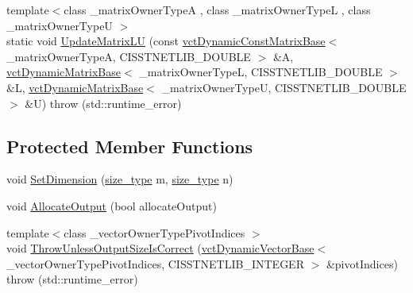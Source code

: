 \begin{DoxyCompactItemize}
\item 
{\footnotesize template$<$class \-\_\-matrix\-Owner\-Type\-A , class \-\_\-matrix\-Owner\-Type\-L , class \-\_\-matrix\-Owner\-Type\-U $>$ }\\static void \hyperlink{classnmr_l_u_dynamic_data_aa443b07fe53b5008e217350c86f4dd35}{Update\-Matrix\-L\-U} (const \hyperlink{classvct_dynamic_const_matrix_base}{vct\-Dynamic\-Const\-Matrix\-Base}$<$ \-\_\-matrix\-Owner\-Type\-A, C\-I\-S\-S\-T\-N\-E\-T\-L\-I\-B\-\_\-\-D\-O\-U\-B\-L\-E $>$ \&A, \hyperlink{classvct_dynamic_matrix_base}{vct\-Dynamic\-Matrix\-Base}$<$ \-\_\-matrix\-Owner\-Type\-L, C\-I\-S\-S\-T\-N\-E\-T\-L\-I\-B\-\_\-\-D\-O\-U\-B\-L\-E $>$ \&L, \hyperlink{classvct_dynamic_matrix_base}{vct\-Dynamic\-Matrix\-Base}$<$ \-\_\-matrix\-Owner\-Type\-U, C\-I\-S\-S\-T\-N\-E\-T\-L\-I\-B\-\_\-\-D\-O\-U\-B\-L\-E $>$ \&U)  throw (std\-::runtime\-\_\-error)
\end{DoxyCompactItemize}
\subsection*{Protected Member Functions}
\begin{DoxyCompactItemize}
\item 
void \hyperlink{classnmr_l_u_dynamic_data_ae25247c2e585c43ca927686461f2c699}{Set\-Dimension} (\hyperlink{classnmr_l_u_dynamic_data_a63259a289f8f94498b5102ce39722bbe}{size\-\_\-type} m, \hyperlink{classnmr_l_u_dynamic_data_a63259a289f8f94498b5102ce39722bbe}{size\-\_\-type} n)
\item 
void \hyperlink{classnmr_l_u_dynamic_data_ae6ca3b268d36249e02ccaea0a5f5c7df}{Allocate\-Output} (bool allocate\-Output)
\item 
{\footnotesize template$<$class \-\_\-vector\-Owner\-Type\-Pivot\-Indices $>$ }\\void \hyperlink{classnmr_l_u_dynamic_data_afca11b4a534d409a919a1dec84052abb}{Throw\-Unless\-Output\-Size\-Is\-Correct} (\hyperlink{classvct_dynamic_vector_base}{vct\-Dynamic\-Vector\-Base}$<$ \-\_\-vector\-Owner\-Type\-Pivot\-Indices, C\-I\-S\-S\-T\-N\-E\-T\-L\-I\-B\-\_\-\-I\-N\-T\-E\-G\-E\-R $>$ \&pivot\-Indices)  throw (std\-::runtime\-\_\-error)
\end{DoxyCompactItemize}
